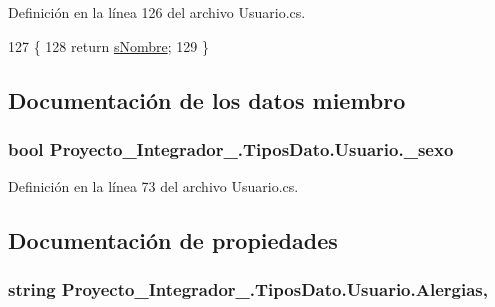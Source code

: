 Definición en la línea 126 del archivo Usuario.\-cs.


\begin{DoxyCode}
127         \{
128             \textcolor{keywordflow}{return} \hyperlink{class_proyecto___integrador__3_1_1_tipos_dato_1_1_usuario_a22974b12ffb877b220ac230d9ce48615}{sNombre};
129         \}
\end{DoxyCode}


\subsection{Documentación de los datos miembro}
\hypertarget{class_proyecto___integrador__3_1_1_tipos_dato_1_1_usuario_a1a0f91fb9a1e9b12a534a31295531498}{
\subsubsection[{\-\_\-sexo}]{\setlength{\rightskip}{0pt plus 5cm}bool Proyecto\-\_\-\-Integrador\-\_.\-Tipos\-Dato.\-Usuario.\-\_\-sexo}}\label{class_proyecto___integrador__3_1_1_tipos_dato_1_1_usuario_a1a0f91fb9a1e9b12a534a31295531498}


Definición en la línea 73 del archivo Usuario.\-cs.



\subsection{Documentación de propiedades}
\hypertarget{class_proyecto___integrador__3_1_1_tipos_dato_1_1_usuario_ab943506068326001f8581e7df6df6c14}{
\subsubsection[{Alergias}]{\setlength{\rightskip}{0pt plus 5cm}string Proyecto\-\_\-\-Integrador\-\_.\-Tipos\-Dato.\-Usuario.\-Alergias\hspace{0.3cm}{\ttfamily [get]}, {\ttfamily [set]}}}\label{class_proyecto___integrador__3_1_1_tipos_dato_1_1_usuario_ab943506068326001f8581e7df6df6c14}


